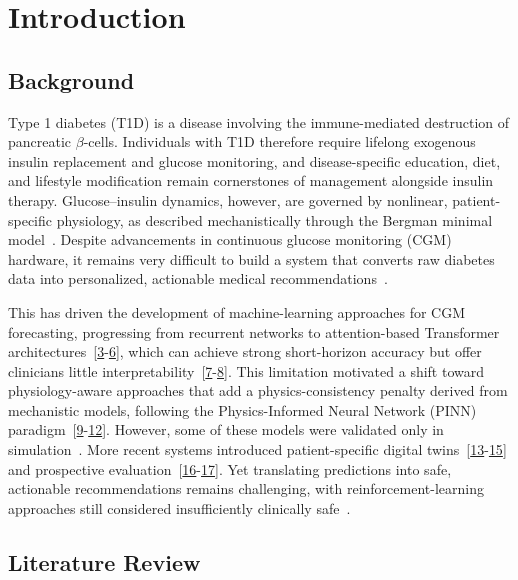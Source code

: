 \documentclass[journal]{IEEEtran}
\begin{document}
\section{Introduction}

\subsection{Background}

Type 1 diabetes (T1D) is a disease involving the immune-mediated destruction of pancreatic $\beta$-cells. Individuals with T1D therefore require lifelong exogenous insulin replacement and glucose monitoring, and disease-specific education, diet, and lifestyle modification remain cornerstones of management alongside insulin therapy. Glucose--insulin dynamics, however, are governed by nonlinear, patient-specific physiology, as described mechanistically through the Bergman minimal model~\cite{ref1}. Despite advancements in continuous glucose monitoring (CGM) hardware, it remains very difficult to build a system that converts raw diabetes data into personalized, actionable medical recommendations~\cite{ref2}.

This has driven the development of machine-learning approaches for CGM forecasting, progressing from recurrent networks to attention-based Transformer architectures~[\hyperref[ref19label]{3}-\hyperref[ref22label]{6}], which can achieve strong short-horizon accuracy but offer clinicians little interpretability~[\hyperref[ref3label]{7}-\hyperref[ref5label]{8}]. This limitation motivated a shift toward physiology-aware approaches that add a physics-consistency penalty derived from mechanistic models, following the Physics-Informed Neural Network (PINN) paradigm~[\hyperref[ref8label]{9}-\hyperref[ref12label]{12}]. However, some of these models were validated only in simulation~\cite{ref9}. More recent systems introduced patient-specific digital twins~[\hyperref[ref13label]{13}-\hyperref[ref16label]{15}] and prospective evaluation~[\hyperref[ref17label]{16}-\hyperref[ref18label]{17}]. Yet translating predictions into safe, actionable recommendations remains challenging, with reinforcement-learning approaches still considered insufficiently clinically safe~\cite{ref6}.

\subsection{Literature Review}
\end{document}
